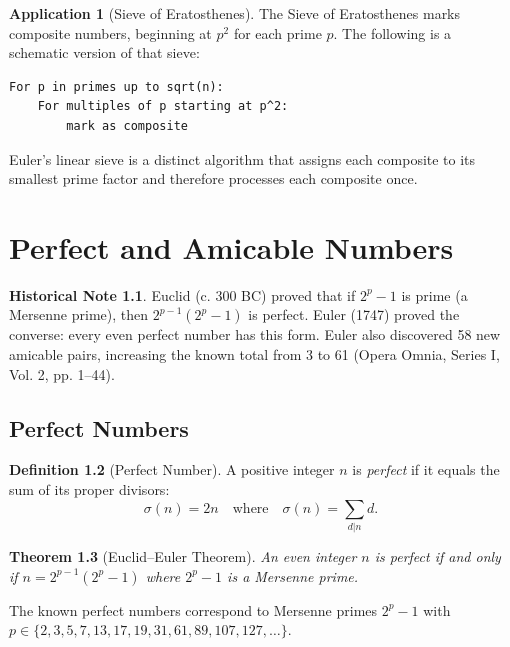 \documentclass[11pt,a4paper,twoside]{book}
\theoremstyle{eulerstyle}
\newtheorem{theorem}{Theorem}[chapter]
\theoremstyle{definition}
\newtheorem{definition}[theorem]{Definition}
\newtheorem{historical}[theorem]{Historical Note}
\newtheorem{application}[theorem]{Application}
\begin{document}
\begin{application}[Sieve of Eratosthenes]
The Sieve of Eratosthenes marks composite numbers, beginning at $p^2$ for each
prime $p$. The following is a schematic version of that sieve:
\begin{verbatim}
For p in primes up to sqrt(n):
    For multiples of p starting at p^2:
        mark as composite
\end{verbatim}
Euler's linear sieve is a distinct algorithm that assigns each composite to its
smallest prime factor and therefore processes each composite once.
\end{application}

\cleardoublepage

\chapter{Perfect and Amicable Numbers}
\label{ch:perfect}

\begin{historical}
Euclid (c. 300 BC) proved that if $2^p - 1$ is prime (a Mersenne prime), then $2^{p-1}(2^p - 1)$ is perfect. Euler (1747) proved the converse: every even perfect number has this form. Euler also discovered 58 new amicable pairs, increasing the known total from 3 to 61 (Opera Omnia, Series I, Vol. 2, pp. 1--44).
\end{historical}

\section{Perfect Numbers}

\begin{definition}[Perfect Number]
A positive integer $n$ is \emph{perfect} if it equals the sum of its proper divisors:
\[
\sigma(n) = 2n \quad \text{where} \quad \sigma(n) = \sum_{d|n} d.
\]
\end{definition}

\begin{theorem}[Euclid--Euler Theorem]
An even integer $n$ is perfect if and only if $n = 2^{p-1}(2^p - 1)$ where $2^p - 1$ is a Mersenne prime.
\end{theorem}

The known perfect numbers correspond to Mersenne primes $2^p - 1$ with $p \in \{2, 3, 5, 7, 13, 17, 19, 31, 61, 89, 107, 127, \dots\}$.
\end{document}
